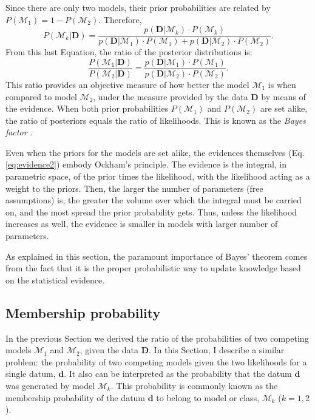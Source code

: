 Since there are only two models, their prior probabilities are related by $P(\mathcal{M}_1)= 1- P(\mathcal{M}_2)$. Therefore,
 \begin{equation}
P(\mathcal{M}_k|\mathbf{D})=\frac{p(\mathbf{D}|\mathcal{M}_k)\cdot P(\mathcal{M}_k)}{p(\mathbf{D}|\mathcal{M}_1)\cdot P(\mathcal{M}_1)+p(\mathbf{D}|\mathcal{M}_2)\cdot P(\mathcal{M}_2)}.
\end{equation}
From this last Equation, the ratio of the posterior distributions is:
\begin{equation}
\label{eq:modelselection}
\frac{P(\mathcal{M}_1|\mathbf{D})}{P(\mathcal{M}_2|\mathbf{D})}=\frac{p(\mathbf{D}|\mathcal{M}_1)\cdot P(\mathcal{M}_1)}{p(\mathbf{D}|\mathcal{M}_2)\cdot P(\mathcal{M}_2)}.
\end{equation}
This ratio provides an objective measure of how better the model $\mathcal{M}_1$ is when compared to model $\mathcal{M}_2$, under the measure provided by the data $\mathbf{D}$ by means of the evidence. When both prior probabilities  $P(\mathcal{M}_1)$ and $P(\mathcal{M}_2)$ are set alike, the ratio of posteriors equals the ratio of likelihoods. This is known as the \emph{Bayes factor} \cite[for a similar derivation and some examples of its application see][]{Kaas1995}. 

Even when the priors for the models are set alike, the evidences themselves (Eq. \ref{eq:evidence2}) embody Ockham's principle. The evidence is the integral, in parametric space, of the prior times the likelihood, with the likelihood acting as a weight to the priors.  Then, the larger the number of parameters (free assumptions) is, the greater the volume over which the integral must be carried on, and the most spread the prior probability gets. Thus, unless the likelihood increases as well, the evidence is smaller in models with larger number of parameters.

As explained in this section, the paramount importance of Bayes' theorem comes from the fact that it is the proper probabilistic way to update knowledge based on the {statistical} evidence.

\subsection{Membership probability}

In the previous Section we {derived} the ratio of the probabilities of two competing models $\mathcal{M}_1$ and $\mathcal{M}_2$, given the data $\mathbf{D}$. In this Section, I describe a similar problem: the probability of two competing models given the two likelihoods for a single datum, $\mathbf{d}$. It also can be interpreted as the probability that the datum $\mathbf{d}$ was generated by model $\mathcal{M}_k$. This probability is commonly known as the membership probability of the datum $\mathbf{d}$ to belong to model or class, $\mathcal{M}_k$ ($k=1,2$). 

